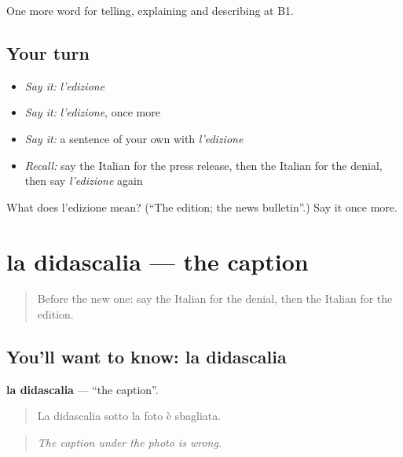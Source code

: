 \begin{grammarlens}[title={What you've built}]
One more word for telling, explaining and describing at B1.
\end{grammarlens}

\subsection*{Your turn}
\begin{itemize}
\raggedright
  \item \emph{Say it:} \emph{l'edizione}
  \item \emph{Say it:} \emph{l'edizione}, once more
  \item \emph{Say it:} a sentence of your own with \emph{l'edizione}
  \item \emph{Recall:} say the Italian for the press release, then the Italian for the denial, then say \emph{l'edizione} again
\end{itemize}

\begin{tcolorbox}[breakable,colback=teal!4,colframe=teal!35!black,title={Before you move on}]
What does l'edizione mean? (\textquotedblleft{}The edition; the news bulletin\textquotedblright{}.) Say it once more.
\end{tcolorbox}
\section[la didascalia]{la didascalia — the caption}

\label{lesson:IT-C286-didascalia}



\begin{quote}
Before the new one: say the Italian for the denial, then the Italian for the edition.
\end{quote}

\subsection*{You'll want to know: la didascalia}
\textbf{la didascalia} — \textquotedblleft{}the caption\textquotedblright{}.

\begin{quote}
La didascalia sotto la foto è sbagliata.
\end{quote}

\begin{quote}
\emph{The caption under the photo is wrong.}
\end{quote}

